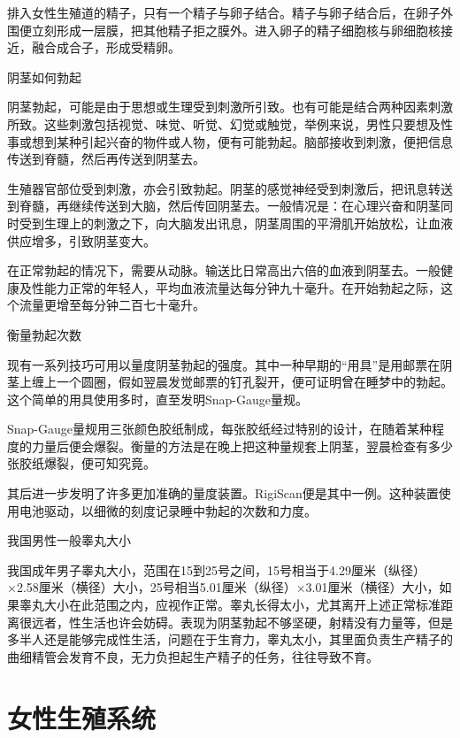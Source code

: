 \documentclass[12pt,UTF8,openany]{ctexbook}
\begin{document}
排入女性生殖道的精子，只有一个精子与卵子结合。精子与卵子结合后，在卵子外围便立刻形成一层膜，把其他精子拒之膜外。进入卵子的精子细胞核与卵细胞核接近，融合成合子，形成受精卵。





阴茎如何勃起


阴茎勃起，可能是由于思想或生理受到刺激所引致。也有可能是结合两种因素刺激所致。这些刺激包括视觉、味觉、听觉、幻觉或触觉，举例来说，男性只要想及性事或想到某种引起兴奋的物件或人物，便有可能勃起。脑部接收到刺激，便把信息传送到脊髓，然后再传送到阴茎去。

生殖器官部位受到刺激，亦会引致勃起。阴茎的感觉神经受到刺激后，把讯息转送到脊髓，再继续传送到大脑，然后传回阴茎去。一般情况是：在心理兴奋和阴茎同时受到生理上的刺激之下，向大脑发出讯息，阴茎周围的平滑肌开始放松，让血液供应增多，引致阴茎变大。

在正常勃起的情况下，需要从动脉。输送比日常高出六倍的血液到阴茎去。一般健康及性能力正常的年轻人，平均血液流量达每分钟九十毫升。在开始勃起之际，这个流量更增至每分钟二百七十毫升。





衡量勃起次数


现有一系列技巧可用以量度阴茎勃起的强度。其中一种早期的“用具”是用邮票在阴茎上缠上一个圆圈，假如翌晨发觉邮票的钉孔裂开，便可证明曾在睡梦中的勃起。这个简单的用具使用多时，直至发明Snap-Gauge量规。

Snap-Gauge量规用三张颜色胶纸制成，每张胶纸经过特别的设计，在随着某种程度的力量后便会爆裂。衡量的方法是在晚上把这种量规套上阴茎，翌晨检查有多少张胶纸爆裂，便可知究竟。

其后进一步发明了许多更加准确的量度装置。RigiScan便是其中一例。这种装置使用电池驱动，以细微的刻度记录睡中勃起的次数和力度。





我国男性一般睾丸大小


我国成年男子睾丸大小，范围在15到25号之间，15号相当于4.29厘米（纵径）×2.58厘米（横径）大小，25号相当5.01厘米（纵径）×3.01厘米（横径）大小，如果睾丸大小在此范围之内，应视作正常。睾丸长得太小，尤其离开上述正常标准距离很远者，性生活也许会妨碍。表现为阴茎勃起不够坚硬，射精没有力量等，但是多半人还是能够完成性生活，问题在于生育力，睾丸太小，其里面负责生产精子的曲细精管会发育不良，无力负担起生产精子的任务，往往导致不育。





\chapter{女性生殖系统}
\end{document}
